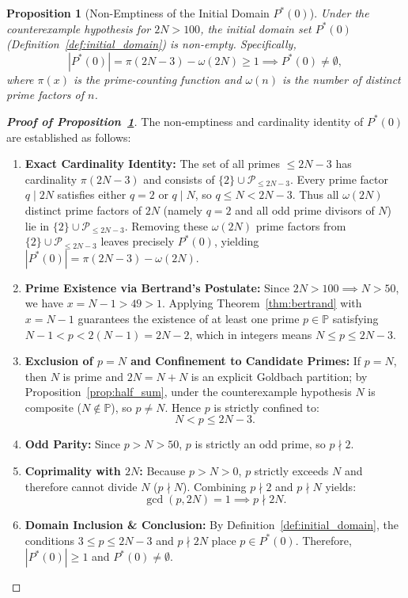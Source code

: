 \documentclass[11pt,a4paper]{article}
\newtheorem{proposition}[theorem]{Proposition}
\theoremstyle{definition}
\begin{document}
\begin{proposition}[Non-Emptiness of the Initial Domain $P^*(0)$]
\label{prop:domain_nonempty}
Under the counterexample hypothesis for $2N > 100$, the initial domain set $P^*(0)$ (Definition~\ref{def:initial_domain}) is non-empty. Specifically,
\[
|P^*(0)| = \pi(2N - 3) - \omega(2N) \ge 1 \implies P^*(0) \neq \emptyset,
\]
where $\pi(x)$ is the prime-counting function and $\omega(n)$ is the number of distinct prime factors of $n$.
\end{proposition}
\begin{proof}[\textbf{Proof of Proposition~\ref{prop:domain_nonempty}}]
The non-emptiness and cardinality identity of $P^*(0)$ are established as follows:
\begin{enumerate}
    \item \textbf{Exact Cardinality Identity:} The set of all primes $\le 2N - 3$ has cardinality $\pi(2N - 3)$ and consists of $\{2\} \cup \mathcal{P}_{\le 2N-3}$. Every prime factor $q \mid 2N$ satisfies either $q = 2$ or $q \mid N$, so $q \le N < 2N - 3$. Thus all $\omega(2N)$ distinct prime factors of $2N$ (namely $q = 2$ and all odd prime divisors of $N$) lie in $\{2\} \cup \mathcal{P}_{\le 2N-3}$. Removing these $\omega(2N)$ prime factors from $\{2\} \cup \mathcal{P}_{\le 2N-3}$ leaves precisely $P^*(0)$, yielding $|P^*(0)| = \pi(2N - 3) - \omega(2N)$.
    \item \textbf{Prime Existence via Bertrand's Postulate:} Since $2N > 100 \implies N > 50$, we have $x = N - 1 > 49 > 1$. Applying Theorem~\ref{thm:bertrand} with $x = N - 1$ guarantees the existence of at least one prime $p \in \mathbb{P}$ satisfying $N - 1 < p < 2(N - 1) = 2N - 2$, which in integers means $N \le p \le 2N - 3$.
    \item \textbf{Exclusion of $p = N$ and Confinement to Candidate Primes:} If $p = N$, then $N$ is prime and $2N = N + N$ is an explicit Goldbach partition; by Proposition~\ref{prop:half_sum}, under the counterexample hypothesis $N$ is composite ($N \notin \mathbb{P}$), so $p \neq N$. Hence $p$ is strictly confined to:
    \[
    N < p \le 2N - 3.
    \]
    \item \textbf{Odd Parity:} Since $p > N > 50$, $p$ is strictly an odd prime, so $p \nmid 2$.
    \item \textbf{Coprimality with $2N$:} Because $p > N > 0$, $p$ strictly exceeds $N$ and therefore cannot divide $N$ ($p \nmid N$). Combining $p \nmid 2$ and $p \nmid N$ yields:
    \[
    \gcd(p, 2N) = 1 \implies p \nmid 2N.
    \]
    \item \textbf{Domain Inclusion \& Conclusion:} By Definition~\ref{def:initial_domain}, the conditions $3 \le p \le 2N - 3$ and $p \nmid 2N$ place $p \in P^*(0)$. Therefore, $|P^*(0)| \ge 1$ and $P^*(0) \neq \emptyset$.
\end{enumerate}
\end{proof}
\end{document}
